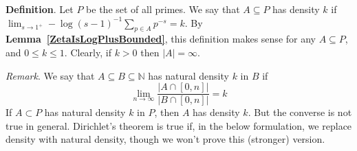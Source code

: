\documentclass[12pt]{article}
\newcommand{\nats}{\mathbb{N}}
\newcommand{\lref}[1]{\textbf{Lemma~\ref{#1}}}
\numberwithin{equation}{section}
\numberwithin{thm}{section}
\numberwithin{lemma}{section}
\numberwithin{cor}{section}
\begin{document}
\textbf{Definition}. Let $P$ be the set of all primes. We say that $A \subseteq P$ has density $k$ if $\lim_{s \to 1^+} -\log(s - 1)^{-1} \sum_{p \in A} p^{-s} = k$. By \lref{ZetaIsLogPlusBounded}, this definition makes sense for any $A \subseteq P$, and $0 \leq k \leq 1$. Clearly, if $k>0$ then $|A| = \infty$.

\textit{Remark}. We say that $A \subseteq B \subseteq \nats$ has natural density $k$ in $B$ if \begin{equation*}\lim_{n \to \infty} \frac{|A \cap [0, n]|}{|B \cap [0, n]|} = k\end{equation*} If $A \subset P$ has natural density $k$ in $P$, then $A$ has density $k$. But the converse is not true in general. Dirichlet's theorem is true if, in the below formulation, we replace density with natural density, though we won't prove this (stronger) version.
\end{document}
